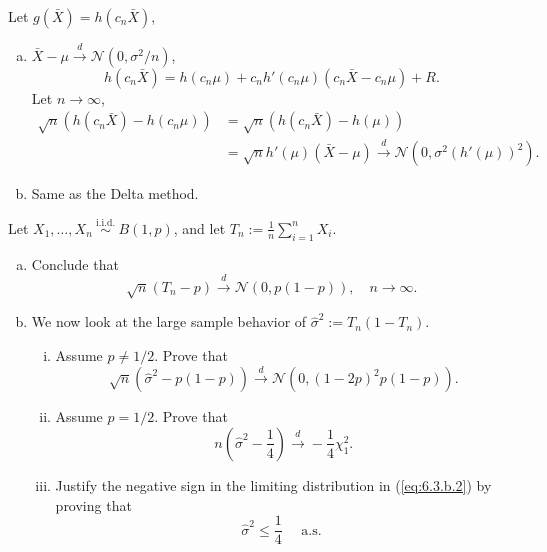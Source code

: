 \begin{solution}
    Let $g(\bar{X})=h(c_n\bar{X})$, 
    \begin{enumerate}[(a)]
        \item $\bar{X}-\mu\stackrel{d}{\rightarrow} \mathcal{N}(0, \sigma^2/n)$, 
        \[
            h(c_n\bar{X})=h(c_n\mu)+c_nh'(c_n\mu)(c_n\bar{X}-c_n\mu)+R.
        \]
        Let $n\to\infty$, 
        \[
            \begin{aligned}
                \sqrt{n}(h(c_n\bar{X})-h(c_n\mu))&=\sqrt{n}(h(c_n\bar{X})-h(\mu))\\
                &=\sqrt{n}h'(\mu)(\bar{X}-\mu)\stackrel{d}{\rightarrow} \mathcal{N}(0,\sigma^2(h'(\mu))^2). 
            \end{aligned}
        \]
        \item Same as the Delta method. 
    \end{enumerate}
\end{solution}

\begin{ex}
    Let \(X_{1}, \ldots, X_{n} \stackrel{\text { i.i.d. }}{\sim} B(1, p)\), and let \(T_{n}:=\frac{1}{n} \sum_{i=1}^{n} X_{i}\). 
    \begin{enumerate}[(a)]
        \item Conclude that
        \[
            \sqrt{n}\left(T_{n}-p\right) \stackrel{d}{\rightarrow} \mathcal{N}(0, p(1-p)), \quad n \rightarrow \infty. 
        \]
        \item We now look at the large sample behavior of \(\widehat{\sigma}^{2}:=T_{n}\left(1-T_{n}\right)\). 
        \begin{enumerate}[(i)]
            \item Assume \(p \neq 1 / 2\). Prove that
            \[
                \sqrt{n}\left(\widehat{\sigma}^{2}-p(1-p)\right) \stackrel{d}{\rightarrow} \mathcal{N}\left(0,(1-2 p)^{2} p(1-p)\right). 
            \]
            \item Assume \(p=1 / 2\). Prove that
            \begin{equation}
                \label{eq:6.3.b.2}
                n\left(\widehat{\sigma}^{2}-\frac{1}{4}\right) \stackrel{d}{\rightarrow}-\frac{1}{4} \chi_{1}^{2}. 
            \end{equation}
            \item Justify the negative sign in the limiting distribution in (\ref{eq:6.3.b.2}) by proving that
            \[
                \widehat{\sigma}^{2} \leq \frac{1}{4} \quad \text { a.s. }
            \]
        \end{enumerate}
    \end{enumerate}
\end{ex}

